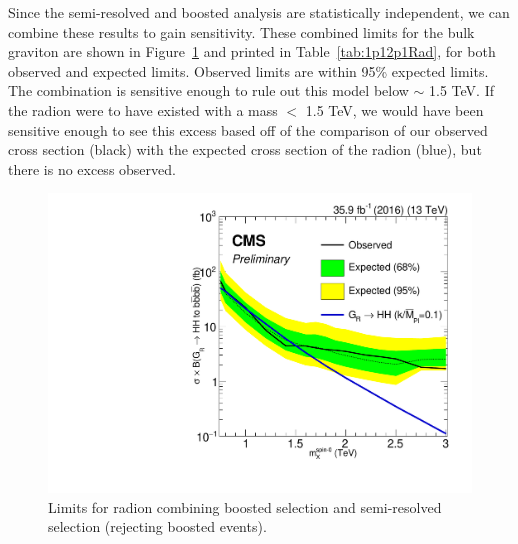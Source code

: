 Since the semi-resolved and boosted analysis are statistically independent, we can combine these results to gain sensitivity. These combined limits for the bulk graviton are shown in Figure~\ref{fig:1p12p1Rad} and printed in Table~\ref{tab:1p12p1Rad}, for both observed and expected limits. Observed limits are within 95\% expected limits. The combination is sensitive enough to rule out this model below $\sim$ 1.5 TeV. If the radion were to have existed with a mass $<$ 1.5 TeV, we would have been sensitive enough to see this excess based off of the comparison of our observed cross section (black) with the expected cross section of the radion (blue), but there is no excess observed.

\begin{figure}[thb!]
\begin{center}
\includegraphics[scale=0.5]{F5/radion.pdf}
\end{center}
\caption{Limits for radion combining boosted selection and semi-resolved selection (rejecting boosted events).}
\label{fig:1p12p1Rad}
\end{figure} 

